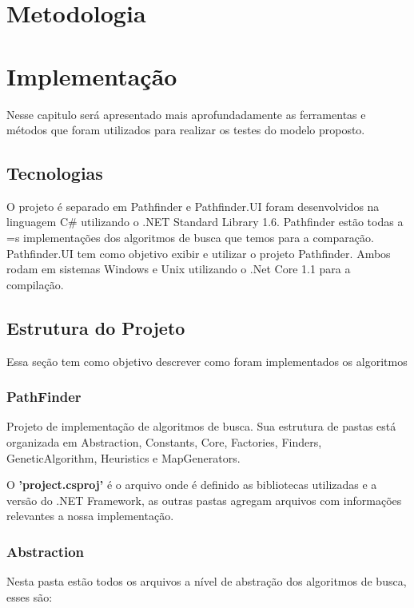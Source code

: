 \chapter[Metodologia]{Metodologia}




\chapter[Implementação]{Implementação}

Nesse capitulo será apresentado mais aprofundadamente as ferramentas e métodos que foram utilizados para realizar os testes do modelo proposto.

\section{Tecnologias}
O projeto é separado em Pathfinder e Pathfinder.UI foram desenvolvidos na linguagem C# utilizando o .NET Standard Library 1.6. Pathfinder estão todas a =s implementações dos algoritmos de busca que temos para a comparação. Pathfinder.UI tem como objetivo exibir e utilizar o projeto Pathfinder. Ambos rodam em sistemas Windows e Unix utilizando o .Net Core 1.1 para a compilação.

\section{Estrutura do Projeto}

Essa seção tem como objetivo descrever como foram implementados os algoritmos 

\subsection {PathFinder}

Projeto de implementação de algoritmos de busca.
Sua estrutura de pastas está organizada em Abstraction, Constants, Core, Factories, Finders, GeneticAlgorithm, Heuristics e MapGenerators.

O \textbf{'project.csproj'} é o arquivo onde é definido as bibliotecas utilizadas e a versão do .NET Framework, as outras pastas agregam arquivos com informações relevantes a nossa implementação.

\subsection{Abstraction}	

Nesta pasta estão todos os arquivos a nível de abstração dos algoritmos de busca, esses são:

